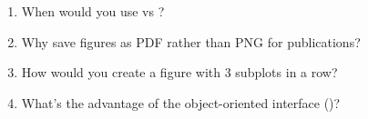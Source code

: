 \begin{ponder}
\begin{enumerate}
    \item When would you use  vs ?
    \item Why save figures as PDF rather than PNG for publications?
    \item How would you create a figure with 3 subplots in a row?
    \item What's the advantage of the object-oriented interface ()?
\end{enumerate}
\end{ponder}
